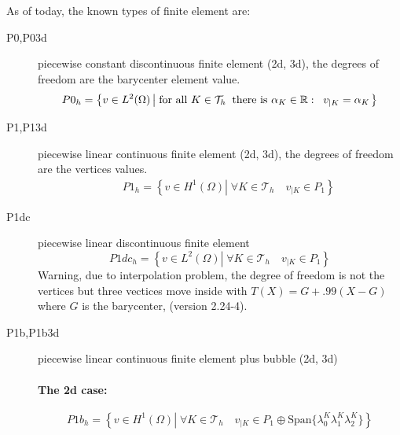 \documentclass[a4paper,twoside,12pt]{book}
\begin{document}
\medskip
 As of today, the known
types of finite element are: 
\begin{description}
     \item[P0,P03d]  piecewise constant discontinuous finite element  (2d, 3d), the degrees of freedom are  the barycenter element value.
    \begin{eqnarray}
    \label{eq:P0}
     P0_{h} = \left\{ v \in L^2(\Omega) \left|\; \textrm{for all }K \in \mathcal{T}_{h}\;\;\textrm{there is }\alpha_{K}\in \mathbb{R} :
        \;\; v_{|K} = \alpha_{K } \right.\right\}
     \end{eqnarray}
     \item[P1,P13d]  piecewise linear  continuous finite element (2d, 3d), the degrees of freedom are the vertices values.
     \begin{eqnarray}
     &&P1_{h} = \left\{ v \in H^{1}(\Omega) \left|\; \forall K \in \mathcal{T}_{h}
        \quad v_{|K} \in P_{1} \right.\right\} \label{eq:P1}
     \end{eqnarray}
     \item[P1dc]  piecewise linear  discontinuous finite element
     \begin{equation}
     P1dc_{h} = \left\{ v \in L^{2}(\Omega) \left|\; \forall K \in \mathcal{T}_{h}
        \quad v_{|K} \in P_{1} \right.\right\} \label{eq:P1dc}
     \end{equation}
     Warning, due to interpolation problem, the degree of freedom is not the vertices but three vectices  move
     inside with $T(X)= G + .99  (X-G) $ where $G$ is the barycenter, (version 2.24-4).
     \item[P1b,P1b3d]  piecewise linear  continuous finite element plus bubble (2d, 3d) \label{warP1dc}

     \paragraph{The 2d case:}
     \begin{equation}
     P1b_{h} = \left\{ v \in H^{1}(\Omega) \left|\; \forall K \in \mathcal{T}_{h}
        \quad v_{|K} \in P_{1} \oplus \mathrm{Span}\{  \lambda^{K}_{0} \lambda^{K}_{1} \lambda^{K}_{2} \} \right.\right\} \label{eq:P1b}
     \end{equation}

\end{description}
\end{document}
